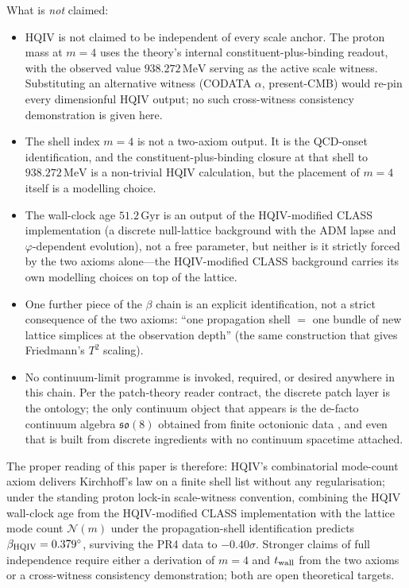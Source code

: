 \documentclass[11pt]{amsart}
\begin{document}
What is \emph{not} claimed:
\begin{itemize}[leftmargin=2em]
\item HQIV is not claimed to be independent of every scale
  anchor.  The proton mass at $m=4$ uses the theory's internal
  constituent-plus-binding readout, with the observed value
  $938.272\,\mathrm{MeV}$ serving as the active scale witness.
  Substituting an alternative witness (CODATA $\alpha$,
  present-CMB) would re-pin every dimensionful HQIV output;
  no such cross-witness consistency demonstration is given here.
\item The shell index $m=4$ is not a two-axiom output.  It is
  the QCD-onset identification, and the constituent-plus-binding
  closure at that shell to $938.272\,\mathrm{MeV}$ is a non-trivial
  HQIV calculation, but the placement of $m=4$ itself is a
  modelling choice.
\item The wall-clock age $51.2\,\mathrm{Gyr}$ is an output of
  the HQIV-modified CLASS implementation (a discrete null-lattice
  background with the ADM lapse and $\varphi$-dependent
  evolution), not a free parameter, but neither is it strictly
  forced by the two axioms alone---the HQIV-modified CLASS
  background carries its own modelling choices on top of the
  lattice.
\item One further piece of the $\beta$ chain is an explicit
  identification, not a strict consequence of the two axioms:
  ``one propagation shell $=$ one bundle of new lattice
  simplices at the observation depth'' (the same construction
  that gives Friedmann's $T^{2}$ scaling).
\item No continuum-limit programme is invoked, required, or
  desired anywhere in this chain. Per the patch-theory reader
  contract, the discrete patch layer is the ontology; the only
  continuum object that appears is the de-facto continuum
  algebra $\mathfrak{so}(8)$ obtained from finite octonionic
  data \cite{hqiv-so8-paper,hqiv-3d-growth-paper}, and even
  that is built from discrete ingredients with no continuum
  spacetime attached.
\end{itemize}

The proper reading of this paper is therefore: HQIV's
combinatorial mode-count axiom delivers Kirchhoff's law on a
finite shell list without any regularisation; under the standing
proton lock-in scale-witness convention, combining the HQIV
wall-clock age from the HQIV-modified CLASS implementation with
the lattice mode count $\mathcal{N}(m)$ under the
propagation-shell identification predicts
$\beta_{\rm HQIV}=0.379^\circ$, surviving the PR4 data
\cite{eskilt2022,planckPR42020} to $-0.40\sigma$.  Stronger
claims of full independence require either a derivation of $m=4$
and $t_{\rm wall}$ from the two axioms or a cross-witness
consistency demonstration; both are open theoretical targets.
\end{document}
